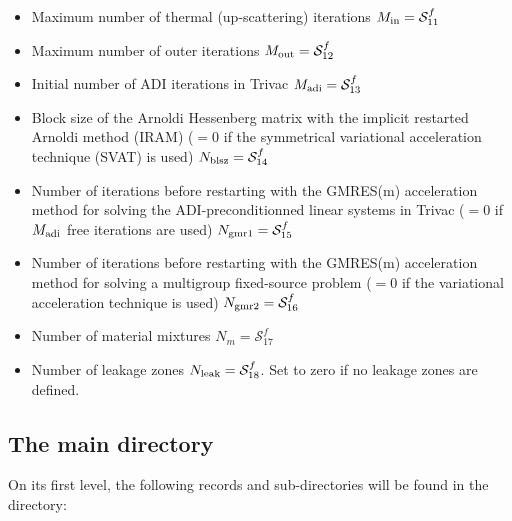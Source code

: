 \begin{itemize}
\item Maximum number of thermal (up-scattering) iterations $M_{\rm in}=\mathcal{S}^{f}_{11}$

\item Maximum number of outer iterations $M_{\rm out}=\mathcal{S}^{f}_{12}$

\item Initial number of ADI iterations in Trivac $M_{\rm adi}=\mathcal{S}^{f}_{13}$

\item Block size of the Arnoldi Hessenberg matrix with the implicit restarted Arnoldi method (IRAM) ($=0$ if the symmetrical variational acceleration technique (SVAT) is used) $N_{\rm blsz}=\mathcal{S}^{f}_{14}$

\item Number of iterations before restarting with the GMRES(m) acceleration method for solving the ADI-preconditionned linear systems in Trivac ($=0$ if $M_{\rm adi}$ free iterations are used) $N_{\rm gmr1}=\mathcal{S}^{f}_{15}$

\item Number of iterations before restarting with the GMRES(m) acceleration method for solving a multigroup fixed-source problem ($=0$ if the variational acceleration technique is used) $N_{\rm gmr2}=\mathcal{S}^{f}_{16}$

\item Number of material mixtures $N_m=\mathcal{S}^{f}_{17}$

\item Number of leakage zones $N_{\rm leak}=\mathcal{S}^{f}_{18}$. Set to zero if no leakage zones are defined.

\end{itemize}

\subsection{The main  directory}\label{sect:fluxunkdirmain}

On its first level, the
following records and sub-directories will be found in the  directory:

